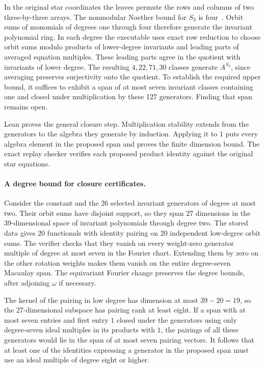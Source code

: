 In the original star coordinates the leaves permute the rows and
columns of two three-by-three arrays. The nonmodular Noether bound
for \(S_3\) is four~\cite{cziszterdomokos}. Orbit sums of
monomials of degrees one through four therefore generate the
invariant polynomial ring. In each degree the executable uses
exact row reduction to choose orbit sums modulo products of
lower-degree invariants and leading parts of averaged equation
multiples. These leading parts agree in the quotient with
invariants of lower degree. The resulting \(4,22,71,30\) classes
generate \(A^{S_3}\), since averaging preserves surjectivity
onto the quotient. To establish the required upper bound, it
suffices to exhibit a span of at most seven invariant classes
containing one and closed under multiplication by these 127
generators.
Finding that span remains open.

Lean proves the general closure step. Multiplication stability
extends from the generators to the algebra they generate by induction.
Applying it to \(1\) puts every algebra element in the proposed
span and proves the finite dimension bound. The exact replay
checker verifies each proposed product identity against the
original star equations.

\paragraph{A degree bound for closure certificates.}
Consider the constant and the 26 selected invariant generators
of degree at most two. Their orbit sums have disjoint support, so
they span 27 dimensions in the 39-dimensional space of invariant
polynomials through degree two. The stored data gives 20 functionals
with identity pairing on 20 independent low-degree orbit sums.
The verifier checks that they vanish on every weight-zero generator
multiple of degree at most seven in the Fourier chart. Extending
them by zero on the other rotation weights makes them vanish on
the entire degree-seven Macaulay span. The equivariant Fourier
change preserves the degree bounds, after adjoining \(\omega\)
if necessary.

The kernel of the pairing in low degree has dimension at most
\(39-20=19\), so the 27-dimensional subspace has pairing rank at
least eight. If a span with at most seven entries and first entry
\(1\) closed under the generators using only degree-seven ideal
multiples in its products with \(1\), the pairings of all these
generators would lie in the span of at most seven pairing vectors.
It follows that at least one of the identities expressing a
generator in the proposed span must use an ideal multiple of
degree eight or higher.

